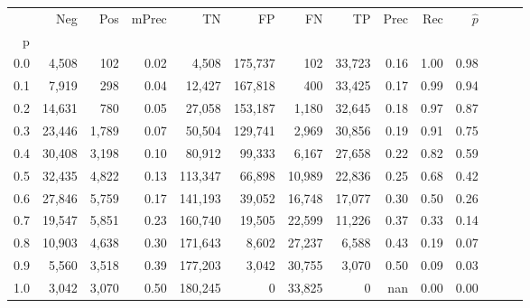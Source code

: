 \begin{tabular}{rrrrrrrrrrrrrr}
\toprule
{} &     Neg &    Pos & mPrec &       TN &       FP &      FN &      TP &  Prec &   Rec & $\hat{p}$ \\
p   &         &        &       &          &          &         &         &       &       &           \\
\midrule
0.0 &   4,508 &    102 &  0.02 &    4,508 &  175,737 &     102 &  33,723 &  0.16 &  1.00 &      0.98 \\
0.1 &   7,919 &    298 &  0.04 &   12,427 &  167,818 &     400 &  33,425 &  0.17 &  0.99 &      0.94 \\
0.2 &  14,631 &    780 &  0.05 &   27,058 &  153,187 &   1,180 &  32,645 &  0.18 &  0.97 &      0.87 \\
0.3 &  23,446 &  1,789 &  0.07 &   50,504 &  129,741 &   2,969 &  30,856 &  0.19 &  0.91 &      0.75 \\
0.4 &  30,408 &  3,198 &  0.10 &   80,912 &   99,333 &   6,167 &  27,658 &  0.22 &  0.82 &      0.59 \\
0.5 &  32,435 &  4,822 &  0.13 &  113,347 &   66,898 &  10,989 &  22,836 &  0.25 &  0.68 &      0.42 \\
0.6 &  27,846 &  5,759 &  0.17 &  141,193 &   39,052 &  16,748 &  17,077 &  0.30 &  0.50 &      0.26 \\
0.7 &  19,547 &  5,851 &  0.23 &  160,740 &   19,505 &  22,599 &  11,226 &  0.37 &  0.33 &      0.14 \\
0.8 &  10,903 &  4,638 &  0.30 &  171,643 &    8,602 &  27,237 &   6,588 &  0.43 &  0.19 &      0.07 \\
0.9 &   5,560 &  3,518 &  0.39 &  177,203 &    3,042 &  30,755 &   3,070 &  0.50 &  0.09 &      0.03 \\
1.0 &   3,042 &  3,070 &  0.50 &  180,245 &        0 &  33,825 &       0 &   nan &  0.00 &      0.00 \\
\bottomrule
\end{tabular}

